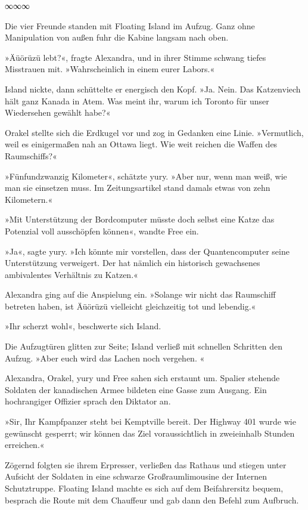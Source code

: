 \begin{center}
∞∞∞
\end{center}

Die vier Freunde standen mit Floating Island im Aufzug. Ganz ohne Manipulation von außen fuhr die Kabine langsam nach oben.

»Äüörüzü lebt?«, fragte Alexandra, und in ihrer Stimme schwang tiefes Misstrauen mit. »Wahrscheinlich in einem eurer Labors.«

Island nickte, dann schüttelte er energisch den Kopf. »Ja. Nein. Das Katzenviech hält ganz Kanada in Atem. Was meint ihr, warum ich Toronto für unser Wiedersehen gewählt habe?«

Orakel stellte sich die Erdkugel vor und zog in Gedanken eine Linie. »Vermutlich, weil es einigermaßen nah an Ottawa liegt. Wie weit reichen die Waffen des Raumschiffs?«

»Fünfundzwanzig Kilometer«, schätzte yury. »Aber nur, wenn man weiß, wie man sie einsetzen muss. Im Zeitungsartikel stand damals etwas von zehn Kilometern.«

»Mit Unterstützung der Bordcomputer müsste doch selbst eine Katze das Potenzial voll ausschöpfen können«, wandte Free ein.

»Ja«, sagte yury. »Ich könnte mir vorstellen, dass der Quantencomputer seine Unterstützung verweigert. Der hat nämlich ein historisch gewachsenes ambivalentes Verhältnis zu Katzen.«

Alexandra ging auf die Anspielung ein. »Solange wir nicht das Raumschiff betreten haben, ist Äüörüzü vielleicht gleichzeitig tot und lebendig.«

»Ihr scherzt wohl«, beschwerte sich Island.


Die Aufzugtüren glitten zur Seite; Island verließ mit schnellen Schritten den Aufzug. »Aber euch wird das Lachen noch vergehen. «

Alexandra, Orakel, yury und Free sahen sich erstaunt um. Spalier stehende Soldaten der kanadischen Armee bildeten eine Gasse zum Ausgang. Ein hochrangiger Offizier sprach den Diktator an.

»Sir, Ihr Kampfpanzer steht bei Kemptville bereit. Der Highway 401 wurde wie gewünscht gesperrt; wir können das Ziel voraussichtlich in zweieinhalb Stunden erreichen.«

Zögernd folgten sie ihrem Erpresser, verließen das Rathaus und stiegen unter Aufsicht der Soldaten in eine schwarze Großraumlimousine der Internen Schutztruppe. Floating Island machte es sich auf dem Beifahrersitz bequem, besprach die Route mit dem Chauffeur und gab dann den Befehl zum Aufbruch.

